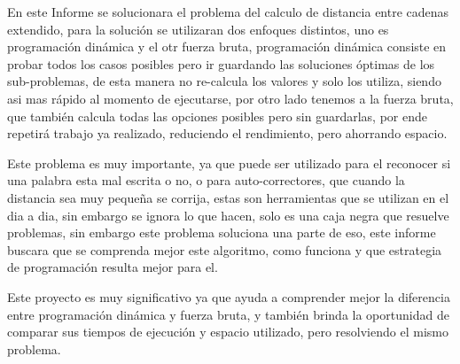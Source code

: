 En este Informe se solucionara el problema del calculo de distancia entre cadenas extendido, para la solución se utilizaran dos enfoques distintos, uno es programación dinámica y el otr fuerza bruta, programación dinámica consiste en probar todos los casos posibles pero ir guardando las soluciones óptimas de los sub-problemas, de esta manera no re-calcula los valores y solo los utiliza, siendo asi mas rápido al momento de ejecutarse, por otro lado tenemos a la fuerza bruta, que también calcula todas las opciones posibles pero sin guardarlas, por ende repetirá trabajo ya realizado, reduciendo el rendimiento, pero ahorrando espacio.

Este problema es muy importante, ya que puede ser utilizado para el reconocer si una palabra esta mal escrita o no, o para auto-correctores, que cuando la distancia sea muy pequeña se corrija, estas son herramientas que se utilizan en el dia a dia, sin embargo se ignora lo que hacen, solo es una caja negra que resuelve problemas, sin embargo este problema soluciona una parte de eso, este informe buscara que se comprenda mejor este algoritmo, como funciona y que estrategia de programación resulta mejor para el.

Este proyecto es muy significativo ya que ayuda a comprender mejor la diferencia entre programación dinámica y fuerza bruta, y también brinda la oportunidad de comparar sus tiempos de ejecución y espacio utilizado, pero resolviendo el mismo problema.





